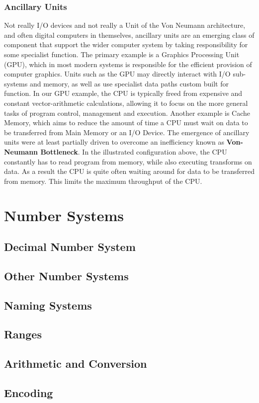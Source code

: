 \documentclass[10pt,a4paper]{article}
\begin{document}
\subsubsection{Ancillary Units}
Not really I/O devices and not really a Unit of the Von Neumann architecture, and often digital computers in themselves, ancillary units are an emerging class of component that support the wider computer system by taking responsibility for some specialist function. The primary example is a Graphics Processing Unit (GPU), which in most modern systems is responsible for the efficient provision of computer graphics. Units such as the GPU may directly interact with I/O sub-systems and memory, as well as use specialist data paths custom built for function. In our GPU example, the CPU is typically freed from expensive and constant vector-arithmetic calculations, allowing it to focus on the more general tasks of program control, management and execution. Another example is Cache Memory, which aims to reduce the amount of time a CPU must wait on data to be transferred from Main Memory or an I/O Device.
\newline
\newline
The emergence of ancillary units were at least partially driven to overcome an inefficiency known as {\bf Von-Neumann Bottleneck}. In the illustrated configuration above, the CPU constantly has to read program from memory, while also executing transforms on data. As a result the CPU is quite often waiting around for data to be transferred from memory. This limits the maximum throughput of the CPU. 

\section{Number Systems}
\subsection{Decimal Number System}
\subsection{Other Number Systems}
\subsection{Naming Systems}
\subsection{Ranges}
\subsection{Arithmetic and Conversion}
\subsection{Encoding}
{}

\end{document}
